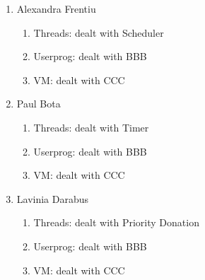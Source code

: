 \documentclass[a4paper,12pt]{report}
\begin{document}
\begin{enumerate}
	\item Alexandra Frentiu
	    \begin{enumerate}
	     \item Threads: dealt with Scheduler
	     \item Userprog: dealt with BBB
	     \item VM: dealt with CCC
	    \end{enumerate}

	\item Paul Bota
	    \begin{enumerate}
	     \item Threads: dealt with Timer
	     \item Userprog: dealt with BBB
	     \item VM: dealt with CCC
	    \end{enumerate}
	    
	\item Lavinia Darabus
	    \begin{enumerate}
	     \item Threads: dealt with Priority Donation
	     \item Userprog: dealt with BBB
	     \item VM: dealt with CCC
	    \end{enumerate}

	   
\end{enumerate}













\end{document}
